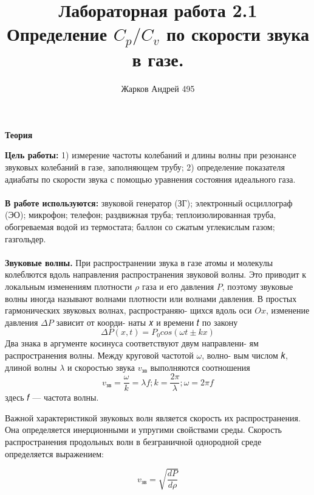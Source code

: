 \documentclass[12pt]{article}
\begin{document}
    \author {Жарков Андрей 495}
    \title {Лабораторная работа 2.1 \\  Определение $C_p / C_v$ по скорости звука в газе.}
    \maketitle{}
    
    \begin{center}
    	\textbf{\large{Теория}}
    \end{center}
    \textbf{Цель работы:} 1) измерение частоты колебаний и длины волны
    при резонансе звуковых колебаний в газе, заполняющем трубу;
    2) определение показателя адиабаты по скорости звука с помощью уравнения состояния идеального газа.
    \\ \\
    \textbf{В работе используются:} звуковой генератор (ЗГ); электронный осциллограф (ЭО); микрофон; телефон; раздвижная труба;
    теплоизолированная труба, обогреваемая водой из термостата;
    баллон со сжатым углекислым газом; газгольдер.
    \\ \\
    
    
    \textbf{Звуковые волны.} При распространении звука в газе атомы и
    молекулы колеблются вдоль направления распространения звуковой волны. Это приводит к локальным изменениям плотности
    $\rho$ газа и его давления $P$, поэтому звуковые волны иногда называют волнами плотности или волнами давления.
    В простых гармонических звуковых волнах, распространяю-
    щихся вдоль оси $Ox$, изменение давления $\Delta P$ зависит от коорди-
    наты 𝑥 и времени 𝑡 по закону $$\Delta P(x, t) = P_0 cos(\omega t \pm kx)$$
    Два знака в аргументе косинуса соответствуют двум направлени-
    ям распространения волны. Между круговой частотой $\omega$, волно-
    вым числом 𝑘, длиной волны $\lambda$ и скоростью звука $𝑣_{зв}$ выполняются соотношения 
    \begin{equation}
    v_{зв} = \frac{\omega}{k} = \lambda f ;k=\frac{2\pi}{\lambda}; \omega = 2\pi f
    \end{equation}
    здесь 𝑓 — частота волны.
    
    Важной характеристикой звуковых волн является скорость их
    распространения. Она определяется инерционными и упругими
    свойствами среды. Скорость распространения продольных волн в
    безграничной однородной среде определяется выражением:
    
    \begin{equation}
    v_{зв} = \sqrt{\frac{dP}{d\rho}}
    \end{equation}
    
\end{document}
